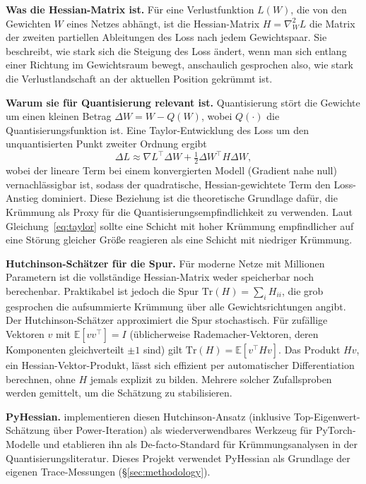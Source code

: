 \textbf{Was die Hessian-Matrix ist.} Für eine Verlustfunktion $L(W)$, die von den Gewichten $W$ eines Netzes abhängt, ist die Hessian-Matrix $H = \nabla^2_W L$ die Matrix der zweiten partiellen Ableitungen des Loss nach jedem Gewichtspaar. Sie beschreibt, wie stark sich die Steigung des Loss ändert, wenn man sich entlang einer Richtung im Gewichtsraum bewegt, anschaulich gesprochen also, wie stark die Verlustlandschaft an der aktuellen Position gekrümmt ist.
\par\medskip

\textbf{Warum sie für Quantisierung relevant ist.} Quantisierung stört die Gewichte um einen kleinen Betrag $\Delta W = W - Q(W)$, wobei $Q(\cdot)$ die Quantisierungsfunktion ist. Eine Taylor-Entwicklung des Loss um den unquantisierten Punkt zweiter Ordnung ergibt
\begin{equation}
\Delta L \approx \nabla L^\top \Delta W + \tfrac{1}{2}\Delta W^\top H \Delta W,
\label{eq:taylor}
\end{equation}
wobei der lineare Term bei einem konvergierten Modell (Gradient nahe null) vernachlässigbar ist, sodass der quadratische, Hessian-gewichtete Term den Loss-Anstieg dominiert. Diese Beziehung ist die theoretische Grundlage dafür, die Krümmung als Proxy für die Quantisierungsempfindlichkeit zu verwenden. Laut Gleichung~\eqref{eq:taylor} sollte eine Schicht mit hoher Krümmung empfindlicher auf eine Störung gleicher Größe reagieren als eine Schicht mit niedriger Krümmung.
\par\medskip

\textbf{Hutchinson-Schätzer für die Spur.} Für moderne Netze mit Millionen Parametern ist die vollständige Hessian-Matrix weder speicherbar noch berechenbar. Praktikabel ist jedoch die Spur $\mathrm{Tr}(H) = \sum_i H_{ii}$, die grob gesprochen die aufsummierte Krümmung über alle Gewichtsrichtungen angibt. Der Hutchinson-Schätzer approximiert die Spur stochastisch. Für zufällige Vektoren $v$ mit $\mathbb{E}[vv^\top] = I$ (üblicherweise Rademacher-Vektoren, deren Komponenten gleichverteilt $\pm 1$ sind) gilt $\mathrm{Tr}(H) = \mathbb{E}[v^\top H v]$. Das Produkt $Hv$, ein Hessian-Vektor-Produkt, lässt sich effizient per automatischer Differentiation berechnen, ohne $H$ jemals explizit zu bilden. Mehrere solcher Zufallsproben werden gemittelt, um die Schätzung zu stabilisieren.
\par\medskip

\textbf{PyHessian.} \citet{yao_pyhessian_2020} implementieren diesen Hutchinson-Ansatz (inklusive Top-Eigenwert-Schätzung über Power-Iteration) als wiederverwendbares Werkzeug für PyTorch-Modelle und etablieren ihn als De-facto-Standard für Krümmungsanalysen in der Quantisierungsliteratur. Dieses Projekt verwendet PyHessian als Grundlage der eigenen Trace-Messungen (\S\ref{sec:methodology}).

